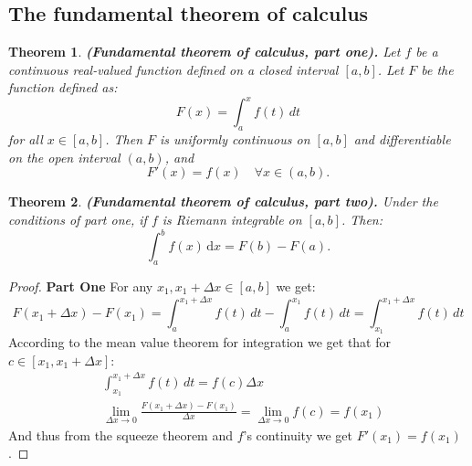 \documentclass[11pt,a4paper]{article}
\theoremstyle{definition}
\theoremstyle{plain}
\newtheorem{theorem}{Theorem}[section]
\newcommand\dx    {\,\mathrm{d}x}
\renewcommand{\tt}[1]{\textnormal{\textbf{(#1).}}} %
\begin{document}
  \subsection{The fundamental theorem of calculus}
  \begin{theorem}\tt{Fundamental theorem of calculus, part one}
    Let $f$ be a continuous real-valued function
    defined on a closed interval $[a, b]$. 
    Let $F$ be the function defined as:
    \[
      F(x) = \int_{a}^{x} f(t)\,dt
    \]
    for all $x \in [a, b]$.
    Then $F$ is uniformly continuous on $[a, b]$ and 
    differentiable on the open interval $(a, b)$, and
    \[
      F'(x) = f(x) \quad \forall x \in (a, b).
    \]
  \end{theorem}
  \begin{theorem}\tt{Fundamental theorem of calculus, part two}
    Under the conditions of part one, if $f$ is Riemann integrable on $[a,b]$.
    Then:
    \[
      \int_{a}^{b} f(x)\dx = F(b) - F(a).
    \]
  \end{theorem}
  \begin{proof}
  \textbf{Part One}
  For any $x_1, x_1+\Delta x\in [a,b]$ we get:
  \[
    F(x_1 + \Delta x) - F(x_1) = 
    \int_{a}^{x_1 + \Delta x}{f(t)\,dt} - \int_{a}^{x_1}{f(t)\,dt} = 
    \int_{x_1}^{x_1 + \Delta x}{f(t)\,dt}
  \]
  According to the mean value theorem for integration 
  we get that for $c \in [x_1, x_1+\Delta x]$:
  \begin{align*}
    &\int_{x_1}^{x_1 + \Delta x}{f(t)\,dt} = f(c)\Delta x \\
    &\lim_{\Delta x\to 0}{\frac{F(x_1+\Delta x) - F(x_1)}{\Delta x}}
    = \lim_{\Delta x\to 0}{f(c)}
    = f(x_1)
  \end{align*}
  And thus from the squeeze theorem and $f$'s continuity 
  we get $F'(x_1) = f(x_1)$.
  \end{proof}
\end{document}
